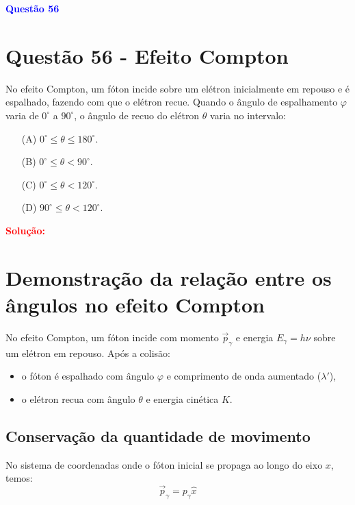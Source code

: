 \documentclass[a4paper,12pt]{article}
\begin{document}
\begin{flushleft}
\textbf{\textcolor{blue}{\Large Quest\~ao 56}}\\
\noindent
\section{Quest\~ao 56 - Efeito Compton}
No efeito Compton, um fóton incide sobre um elétron inicialmente em repouso e é espalhado, fazendo com que o elétron recue.  
Quando o ângulo de espalhamento \( \varphi \) varia de \(0^\circ\) a \(90^\circ\), o ângulo de recuo do elétron \( \theta \) 
varia no intervalo:


\begin{itemize}
\item[(A)] $0^{\circ} \leq \theta \leq 180^{\circ}$.
\item[(B)] $0^{\circ} \leq \theta < 90^{\circ}$.
\item[(C)] $0^{\circ} \leq \theta < 120^{\circ}$.
\item[(D)] $90^{\circ} \leq \theta < 120^{\circ}$.
\end{itemize}

\vspace{0.5cm}

\textcolor{red}{\textbf{Solução:}}\\

\section*{Demonstração da relação entre os ângulos no efeito Compton}

No efeito Compton, um fóton incide com momento \( \vec{p}_\gamma \) e energia \( E_\gamma = h\nu \) sobre um elétron em repouso.  
Após a colisão:
\begin{itemize}
    \item o fóton é espalhado com ângulo \( \varphi \) e comprimento de onda aumentado (\( \lambda' \)),
    \item o elétron recua com ângulo \( \theta \) e energia cinética \( K \).
\end{itemize}

\subsection*{Conservação da quantidade de movimento}

No sistema de coordenadas onde o fóton inicial se propaga ao longo do eixo \(x\), temos:
\[
\vec{p}_\gamma = p_\gamma \hat{x}
\]


\end{flushleft}
\end{document}
